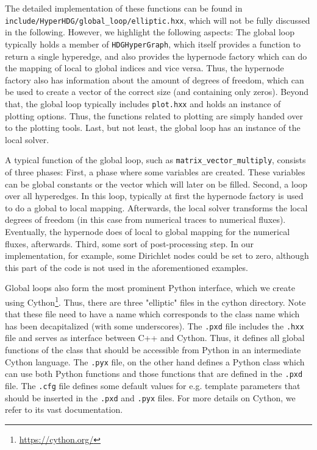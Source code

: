 \documentclass[a4paper, english, 12pt, reqno, draft]{amsart}
\theoremstyle{definition}
\theoremstyle{remark}
\numberwithin{equation}{section}
\newcommand{\code}[1]{\texttt{#1}}
\begin{document}
The detailed implementation of these functions can be found in \code{include/\-HyperHDG/\-global\_loop/elliptic.hxx}, which will not be fully discussed in the following. However, we highlight the following aspects: The global loop typically holds a member of \code{HDGHyperGraph}, which itself provides a function to return a single hyperedge, and also provides the hypernode factory which can do the mapping of local to global indices and vice versa. Thus, the hypernode factory also has information about the amount of degrees of freedom, which can be used to create a vector of the correct size (and containing only zeros). Beyond that, the global loop typically includes \code{plot.hxx} and holds an instance of plotting options. Thus, the functions related to plotting are simply handed over to the plotting tools. Last, but not least, the global loop has an instance of the local solver.

A typical function of the global loop, such as \code{matrix\_\-vector\_\-multiply}, consists of three phases: First, a phase where some variables are created. These variables can be global constants or the vector which will later on be filled. Second, a loop over all hyperedges. In this loop, typically at first the hypernode factory is used to do a global to local mapping. Afterwards, the local solver transforms the local degrees of freedom (in this case from numerical traces to numerical fluxes). Eventually, the hypernode does of local to global mapping for the numerical fluxes, afterwards. Third, some sort of post-processing step. In our implementation, for example, some Dirichlet nodes could be set to zero, although this part of the code is not used in the aforementioned examples.

Global loops also form the most prominent Python interface, which we create using Cython\footnote{\url{https://cython.org/}}. Thus, there are three "elliptic" files in the cython directory. Note that these file need to have a name which corresponds to the class name which has been decapitalized (with some underscores). The \code{.pxd} file includes the \code{.hxx} file and serves as interface between C++ and Cython. Thus, it defines all global functions of the class that should be accessible from Python in an intermediate Cython language. The \code{.pyx} file, on the other hand defines a Python class which can use both Python functions and those functions that are defined in the \code{.pxd} file. The \code{.cfg} file defines some default values for e.g. template parameters that should be inserted in the \code{.pxd} and \code{.pyx} files. For more details on Cython, we refer to its vast documentation.
%
\end{document}

